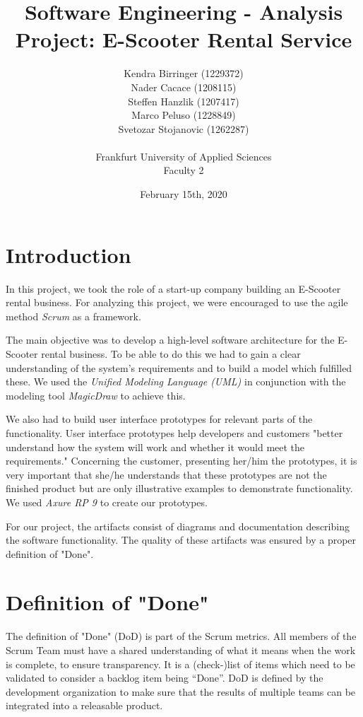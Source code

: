 \documentclass[a4paper, 12pt]{article}
\title{Software Engineering - Analysis\\
Project: E-Scooter Rental Service}
\author{
    Kendra Birringer (1229372)\\
    Nader Cacace (1208115)\\
    Steffen Hanzlik (1207417)\\
    Marco Peluso (1228849)\\
    Svetozar Stojanovic (1262287)\\
    \\
    Frankfurt University of Applied Sciences
    \\ Faculty 2
}
\date{February 15th, 2020}
\begin{document}
\maketitle
\newpage
\tableofcontents

\newpage
\section{Introduction}
In this project, we took the role of a start-up company building an E-Scooter rental business.
For analyzing this project, we were encouraged to use the agile method \emph{Scrum} \cite{scrum} as a framework.

The main objective was to develop a high-level software architecture for the E-Scooter rental business. To be able to do this we had to gain a clear understanding of the system's requirements and to build a model which fulfilled these. We used the \emph{Unified Modeling Language (UML)} \cite{uml} in conjunction with the modeling tool \emph{MagicDraw} \cite{magicdraw} to achieve this.

We also had to build user interface prototypes for relevant parts of the functionality. User interface prototypes help developers and customers "better understand how the system will work and whether it would meet the requirements." \cite{thoma} Concerning the customer, presenting her/him the prototypes, it is very important that she/he understands that these prototypes are not the finished product but are only illustrative examples to demonstrate functionality. We used \emph{Axure RP 9} \cite{axure} to create our prototypes.

For our project, the artifacts consist of diagrams and documentation describing the software functionality. The quality of these artifacts was ensured by a proper definition of "Done".

\section{Definition of "Done"}
The definition of "Done" (DoD) is part of the Scrum metrics. All members of the Scrum Team must have a shared understanding of what it means when the work is complete, to ensure transparency. \cite{scrumguide}
It is a (check-)list of items which need to be validated to consider a backlog item being “Done”. DoD is defined by the development organization to make sure that the results of multiple teams can be integrated into a releasable product. \cite{thoma1}
\end{document}
